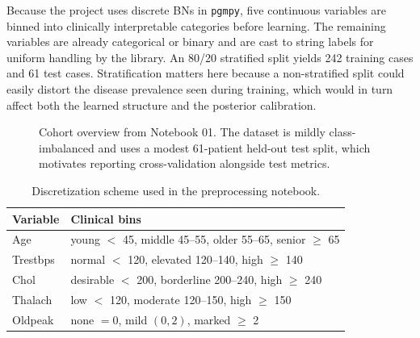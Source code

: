 \documentclass[10pt,twocolumn]{article}
\begin{document}
Because the project uses discrete BNs in \texttt{pgmpy}, five continuous variables are binned into clinically interpretable categories before learning. The remaining variables are already categorical or binary and are cast to string labels for uniform handling by the library. An 80/20 stratified split yields 242 training cases and 61 test cases. Stratification matters here because a non-stratified split could easily distort the disease prevalence seen during training, which would in turn affect both the learned structure and the posterior calibration.

\begin{figure}[t]
\centering
{}
\caption{Cohort overview from Notebook 01. The dataset is mildly class-imbalanced and uses a modest 61-patient held-out test split, which motivates reporting cross-validation alongside test metrics.}
\label{fig:cohort}
\end{figure}

\begin{table}[t]
\centering
\small
\caption{Discretization scheme used in the preprocessing notebook.}
\begin{tabular}{p{}p{}}
\toprule
Variable & Clinical bins \\
\midrule
Age & young $<$ 45, middle 45--55, older 55--65, senior $\geq$ 65 \\
Trestbps & normal $<$ 120, elevated 120--140, high $\geq$ 140 \\
Chol & desirable $<$ 200, borderline 200--240, high $\geq$ 240 \\
Thalach & low $<$ 120, moderate 120--150, high $\geq$ 150 \\
Oldpeak & none $= 0$, mild $(0,2)$, marked $\geq$ 2 \\
\bottomrule
\end{tabular}
\label{tab:bins}
\end{table}
\end{document}
